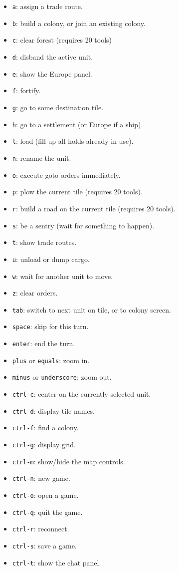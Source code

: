 \documentclass[12pt]{book}
\begin{document}
\pagebreak[2]
\begin{itemize}
\item\verb$a$: assign a trade route.
\item\verb$b$: build a colony, or join an existing colony.
\item\verb$c$: clear forest (requires 20 tools)
\item\verb$d$: disband the active unit.
\item\verb$e$: show the Europe panel.
\item\verb$f$: fortify.
\item\verb$g$: go to some destination tile.
\item\verb$h$: go to a settlement (or Europe if a ship).
\item\verb$l$: load (fill up all holds already in use).
\item\verb$n$: rename the unit.
\item\verb$o$: execute goto orders immediately.
\item\verb$p$: plow the current tile (requires 20 tools).
\item\verb$r$: build a road on the current tile (requires 20 tools).
\item\verb$s$: be a sentry (wait for something to happen).
\item\verb$t$: show trade routes.
\item\verb$u$: unload or dump cargo.
\item\verb$w$: wait for another unit to move.
\item\verb$z$: clear orders.
\item\verb$tab$: switch to next unit on tile, or to colony screen.
\item\verb$space$: skip for this turn.
\item\verb$enter$: end the turn.
\item\verb$plus$ or \verb$equals$: zoom in.
\item\verb$minus$ or \verb$underscore$: zoom out.
\item\verb$ctrl-c$: center on the currently selected unit.
\item\verb$ctrl-d$: display tile names.
\item\verb$ctrl-f$: find a colony.
\item\verb$ctrl-g$: display grid.
\item\verb$ctrl-m$: show/hide the map controls.
\item\verb$ctrl-n$: new game.
\item\verb$ctrl-o$: open a game.
\item\verb$ctrl-q$: quit the game.
\item\verb$ctrl-r$: reconnect.
\item\verb$ctrl-s$: save a game.
\item\verb$ctrl-t$: show the chat panel.
\end{itemize}
\end{document}

